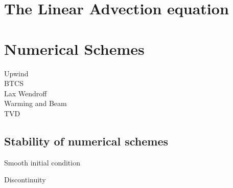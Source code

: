 \documentclass[11pt,a4paper]{article}
\begin{document}
\section{The Linear Advection equation}

\section{Numerical Schemes}
Upwind \\
BTCS\\
Lax Wendroff\\
Warming and Beam \\
TVD \\

\subsection{Stability of numerical schemes}
Smooth initial condition




Discontinuity
\end{document}
